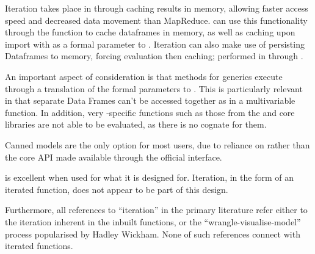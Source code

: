 Iteration takes place in  through caching results in memory,
allowing faster access speed and decreased data movement than
MapReduce\cite{zaharia2010spark}.
 can use this functionality through the  function to cache  dataframes in memory, as well as caching upon import with  as a formal parameter to .
Iteration can also make use of persisting  Dataframes to memory, forcing evaluation then caching; performed in  through .

An important aspect of consideration is that  methods for  generics execute through a translation of the formal parameters to .
This is particularly relevant in that separate  Data Frames can't be accessed together as in a multivariable function. 
In addition, very \R-specific functions such as those from the  and  core libraries are not able to be evaluated, as there is
no  cognate for them.

Canned models are the only option for most users, due to  reliance on  rather than the  core API
made available through the official  interface.

 is excellent when used for what it is designed for. Iteration,
in the form of an iterated function, does not appear to be part of this
design.

Furthermore, all references to ``iteration'' in the primary 
literature refer either to the iteration inherent in the inbuilt  functions, or the ``wrangle-visualise-model'' process popularised by
Hadley Wickham\cites{luraschi2019mastering,wickham2016r}. None of such
references connect with iterated functions.

